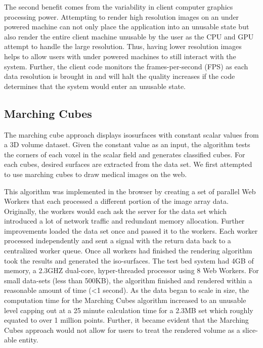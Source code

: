 \documentclass[annual]{acmsiggraph}
\begin{document}
The second benefit comes from the variability in client computer graphics processing power.  Attempting to render high resolution images on an under powered machine can not only place the application into an unusable state but also render the entire client machine unusable by the user as the CPU and GPU attempt to handle the large resolution.  Thus, having lower resolution images helps to allow users with under powered machines to still interact with the system.  Further, the client code monitors the frames-per-second (FPS) as each data resolution is brought in and will halt the quality increases if the code determines that the system would enter an unusable state.

\subsection{Marching Cubes}
	The marching cube approach displays isosurfaces with constant scalar values from a 3D volume dataset. Given the constant value as an input, the algorithm tests the corners of each voxel in the scalar field and generates classified cubes. For each cubes, desired surfaces are extracted from the data set. We first attempted to use marching cubes to draw medical images on the web.

	This algorithm was implemented in the browser by creating a set of parallel Web Workers that each processed a different portion of the image array data.  Originally, the workers would each ask the server for the data set which introduced a lot of network traffic and redundant memory allocation.  Further improvements loaded the data set once and passed it to the workers.  Each worker processed independently and sent a signal with the return data back to a centralized worker queue.  Once all workers had finished the rendering algorithm took the results and generated the iso-surfaces.  
	The test bed system had 4GB of memory, a 2.3GHZ dual-core, hyper-threaded processor using 8 Web Workers.  For small data-sets (less than 500KB), the algorithm finished and rendered within a reasonable amount of time (\textless 1 second).  As the data began to scale in size, the computation time for the Marching Cubes algorithm increased to an unusable level capping out at a 25 minute calculation time for a 2.3MB set which roughly equated to over 1 million points.  Further, it became evident that the Marching Cubes approach would not allow for users to treat the rendered volume as a slice-able entity.
\end{document}

